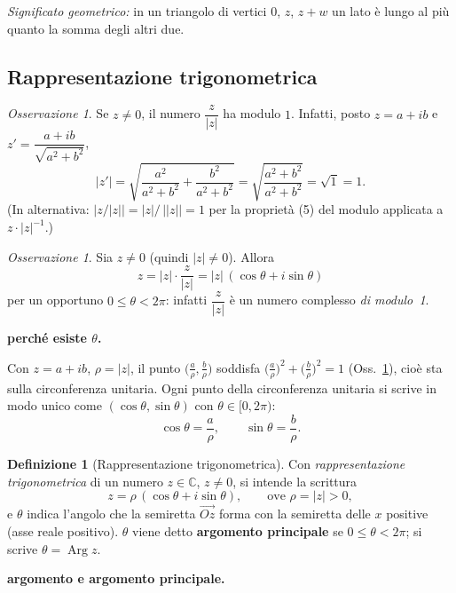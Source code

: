 \documentclass[11pt,a4paper]{article}
\newcommand{\CC}{\mathbb{C}}
\newcommand{\Arg}{\operatorname{Arg}}
\theoremstyle{plain}
\theoremstyle{definition}
\newtheorem{defn}[prop]{Definizione}
\theoremstyle{remark}
\newtheorem{oss}[prop]{Osservazione}
\begin{document}
\smallskip
\emph{Significato geometrico:} in un triangolo di vertici $0$, $z$, $z+w$ un lato è lungo al più quanto la somma degli altri due.
\par\medskip

\subsection{Rappresentazione trigonometrica}

\begin{oss}\label{oss:modulo1}
Se $z\neq0$, il numero $\dfrac{z}{|z|}$ ha modulo $1$.
Infatti, posto $z=a+ib$ e $z'=\dfrac{a+ib}{\sqrt{a^2+b^2}}$,
\[
  |z'|=\sqrt{\frac{a^2}{a^2+b^2}+\frac{b^2}{a^2+b^2}}=\sqrt{\frac{a^2+b^2}{a^2+b^2}}=\sqrt1=1 .
\]
(In alternativa: $|z/|z||=|z|/\,||z||=1$ per la proprietà (5) del modulo applicata a $z\cdot|z|^{-1}$.)
\end{oss}

\begin{oss}\label{oss:trig}
Sia $z\neq0$ (quindi $|z|\neq0$). Allora
\[
  z=|z|\cdot\frac{z}{|z|}=|z|\,(\cos\theta+i\sin\theta)
\]
per un opportuno $0\le\theta<2\pi$: infatti $\dfrac z{|z|}$ è un numero complesso \emph{di modulo~1}.
\end{oss}

\par\medskip
\noindent\textbf{perché esiste $\theta$.}\par

Con $z=a+ib$, $\rho=|z|$, il punto $\bigl(\tfrac a\rho,\tfrac b\rho\bigr)$ soddisfa
$\bigl(\tfrac a\rho\bigr)^2+\bigl(\tfrac b\rho\bigr)^2=1$ (Oss.~\ref{oss:modulo1}), cioè sta sulla circonferenza unitaria.
Ogni punto della circonferenza unitaria si scrive in modo unico come $(\cos\theta,\sin\theta)$ con $\theta\in[0,2\pi)$:
\[
  \cos\theta=\frac a\rho,\qquad \sin\theta=\frac b\rho .
\]
\par\medskip

\begin{defn}[Rappresentazione trigonometrica]
Con \emph{rappresentazione trigonometrica} di un numero $z\in\CC$, $z\neq0$, si intende la scrittura
\[
  z=\rho\,(\cos\theta+i\sin\theta),\qquad\text{ove }\rho=|z|>0,
\]
e $\theta$ indica l'angolo che la semiretta $\overrightarrow{Oz}$ forma con la semiretta delle $x$ positive (asse reale positivo).
$\theta$ viene detto \textbf{argomento principale} se $0\le\theta<2\pi$; si scrive $\theta=\Arg z$.
\end{defn}

\par\medskip
\noindent\textbf{argomento e argomento principale.}\par
\end{document}
